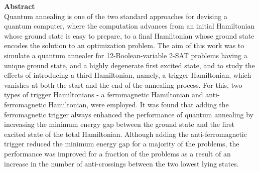 \documentclass[12]{article}
\begin{document}
\textbf{Abstract}\\
Quantum annealing is one of the two standard approaches for devising a quantum computer, where the computation advances from an initial Hamiltonian whose ground state is easy to prepare, to a final Hamiltonian whose ground state encodes the solution to an optimization problem. The aim of this work was to simulate a quantum annealer for 12-Boolean-variable 2-SAT problems having a unique ground state, and a highly degenerate first excited state, and to study the effects of introducing a third Hamiltonian, namely, a trigger Hamiltonian, which vanishes at both the start and the end of the annealing process. For this, two types of trigger Hamiltonians - a ferromagnetic Hamiltonian and anti-ferromagnetic Hamiltonian, were employed. It was found that adding the ferromagnetic trigger always enhanced the performance of quantum annealing by increasing the minimum energy gap between the ground state and the first excited state of the total Hamiltonian. Although adding the anti-ferromagnetic trigger reduced the minimum energy gap for a majority of the problems, the performance was improved for a fraction of the problems as a result of an increase in the number of anti-crossings between the two lowest lying states.
\end{document}
